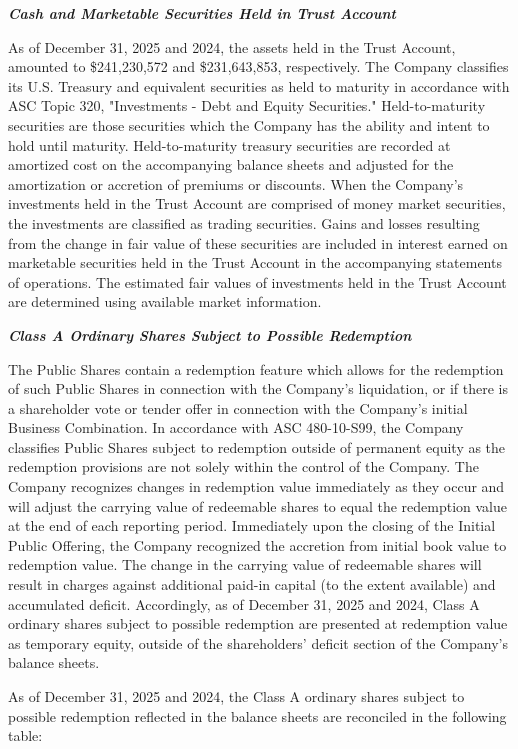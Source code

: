 \documentclass[11pt,a4paper]{article}
\begin{document}
\textit{\textbf{Cash and Marketable Securities Held in Trust Account}}

As of December 31, 2025 and 2024, the assets held in the Trust Account, amounted to \$241,230,572 and \$231,643,853, respectively. The Company classifies its U.S. Treasury and equivalent securities as held to maturity in accordance with ASC Topic 320, "Investments - Debt and Equity Securities." Held-to-maturity securities are those securities which the Company has the ability and intent to hold until maturity. Held-to-maturity treasury securities are recorded at amortized cost on the accompanying balance sheets and adjusted for the amortization or accretion of premiums or discounts. When the Company's investments held in the Trust Account are comprised of money market securities, the investments are classified as trading securities. Gains and losses resulting from the change in fair value of these securities are included in interest earned on marketable securities held in the Trust Account in the accompanying statements of operations. The estimated fair values of investments held in the Trust Account are determined using available market information.

\textit{\textbf{Class A Ordinary Shares Subject to Possible Redemption}}

The Public Shares contain a redemption feature which allows for the redemption of such Public Shares in connection with the Company's liquidation, or if there is a shareholder vote or tender offer in connection with the Company's initial Business Combination. In accordance with ASC 480-10-S99, the Company classifies Public Shares subject to redemption outside of permanent equity as the redemption provisions are not solely within the control of the Company. The Company recognizes changes in redemption value immediately as they occur and will adjust the carrying value of redeemable shares to equal the redemption value at the end of each reporting period. Immediately upon the closing of the Initial Public Offering, the Company recognized the accretion from initial book value to redemption value. The change in the carrying value of redeemable shares will result in charges against additional paid-in capital (to the extent available) and accumulated deficit. Accordingly, as of December 31, 2025 and 2024, Class A ordinary shares subject to possible redemption are presented at redemption value as temporary equity, outside of the shareholders' deficit section of the Company's balance sheets.

As of December 31, 2025 and 2024, the Class A ordinary shares subject to possible redemption reflected in the balance sheets are reconciled in the following table:
\end{document}
